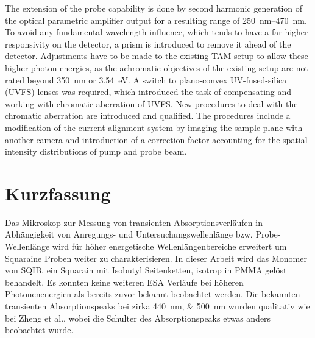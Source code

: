 \documentclass[twoside,openright,listof=numbered]{scrreprt}
\begin{document}
The extension of the probe capability is done by second harmonic generation of the optical parametric amplifier output for a resulting range of \SIrange{250}{470}{\nano\meter}. To avoid any fundamental wavelength influence, which tends to have a far higher responsivity on the detector, a prism is introduced to remove it ahead of the detector. Adjustments have to be made to the existing TAM setup to allow these higher photon energies, as the achromatic objectives of the existing setup are not rated beyond \qty{350}{\nano\meter} or \qty{3.54}{\electronvolt}. A switch to plano-convex UV-fused-silica (UVFS) lenses was required, which introduced the task of compensating and working with chromatic aberration of UVFS. New procedures to deal with the chromatic aberration are introduced and qualified. The procedures include a modification of the current alignment system by imaging the sample plane with another camera and introduction of a correction factor accounting for the spatial intensity distributions of pump and probe beam.

\chapter*{Kurzfassung}
Das Mikroskop zur Messung von transienten Absorptionsverläufen in Abhängigkeit von Anregungs- und Untersuchungswellenlänge bzw. Probe-Wellenlänge wird für höher energetische Wellenlängenbereiche erweitert um Squaraine Proben weiter zu charakterisieren. In dieser Arbeit wird das Monomer von SQIB, ein Squarain mit Isobutyl Seitenketten, isotrop in PMMA gelöst behandelt. Es konnten keine weiteren ESA Verläufe bei höheren Photonenenergien als bereits zuvor bekannt beobachtet werden. Die bekannten transienten Absorptionspeaks bei zirka \SIlist{440;500}{\nano\meter} wurden qualitativ wie bei Zheng et al.\cite{Zheng2020}, wobei die Schulter des Absorptionspeaks etwas anders beobachtet wurde.
\end{document}
